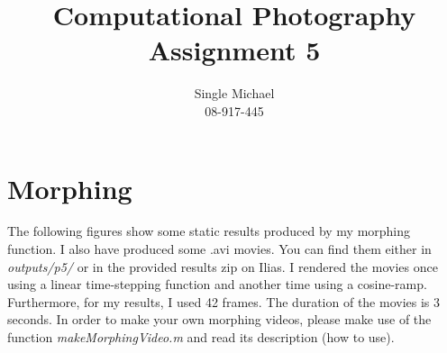 \documentclass{paper}
\title{Computational Photography Assignment 5}
\author{Single Michael\\08-917-445}
\begin{document}
\maketitle

\section{Morphing}
The following figures show some static results produced by my morphing function. I also have produced some .avi movies. You can find them either in \emph{outputs/p5/} or in the provided results zip on Ilias. I rendered the movies once using a linear time-stepping function and another time using a cosine-ramp. Furthermore, for my results, I used 42 frames. The duration of the movies is 3 seconds. In order to make your own morphing videos, please make use of the function \emph{makeMorphingVideo.m} and read its description (how to use).
\end{document}
